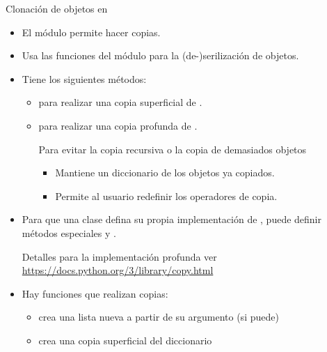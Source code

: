 \documentclass[10pt,envcountsect,spanish]{beamer}
\begin{document}
\begin{frame}[fragile]{Clonación de objetos en } 

\begin{itemize}
\item El módulo  permite hacer copias. 
\item Usa las funciones del módulo  para la (de-)serilización de objetos.
\item Tiene los siguientes métodos:

\begin{itemize}
\item {} para realizar una copia superficial de .
\item {} para realizar una copia profunda de .

Para evitar la copia recursiva o la copia de demasiados objetos
\begin{itemize}
\item Mantiene un diccionario  de los objetos ya copiados.
\item Permite al usuario redefinir los operadores de copia.
\end{itemize}
\end{itemize}

\item Para que una clase defina su propia implementación de , puede definir métodos especiales  y .

{\small Detalles para la implementación profunda ver \scriptsize \url{https://docs.python.org/3/library/copy.html}}

\item Hay funciones que realizan copias:
\begin{itemize}
\item {} crea una lista nueva a partir de su argumento (si puede)
\item {} crea una copia superficial del diccionario 
\end{itemize}

\end{itemize}

\end{frame}
\end{document}
